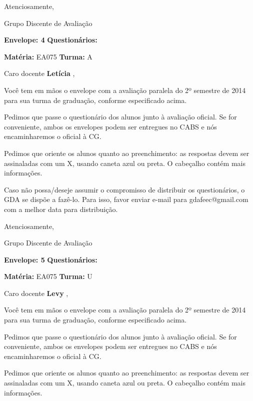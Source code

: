 \documentclass[a5paper]{letter}
\begin{document}
Atenciosamente, 

Grupo Discente de Avaliação

\vspace{0.5cm}

{\bf Envelope: 4 }		\hfill	{\bf Questionários:} \hspace{2cm}

\newpage
\thispagestyle{empty}

\hfill {\bf Matéria:} EA075 {\bf Turma:} A

Caro docente {\bf Letícia }, 

	Você tem em mãos o envelope com a avaliação paralela do 2º semestre de 2014 para sua turma de graduação, conforme especificado acima.

	Pedimos que passe o questionário dos alunos junto à avaliação oficial. Se for conveniente, ambos os envelopes podem ser entregues no CABS e nós encaminharemos o oficial à CG.

Pedimos que oriente os alunos quanto ao preenchimento: as respostas devem ser assinaladas com um X, usando caneta azul ou preta. O cabeçalho contém mais informações.

	Caso não possa/deseje assumir o compromisso de distribuir os questionários, o GDA se dispõe a fazê-lo. Para isso, favor enviar e-mail para gdafeec@gmail.com com a melhor data para distribuição.


Atenciosamente, 

Grupo Discente de Avaliação

\vspace{0.5cm}

{\bf Envelope: 5 }		\hfill	{\bf Questionários:} \hspace{2cm}

\newpage
\thispagestyle{empty}

\hfill {\bf Matéria:} EA075 {\bf Turma:} U

Caro docente {\bf Levy }, 

	Você tem em mãos o envelope com a avaliação paralela do 2º semestre de 2014 para sua turma de graduação, conforme especificado acima.

	Pedimos que passe o questionário dos alunos junto à avaliação oficial. Se for conveniente, ambos os envelopes podem ser entregues no CABS e nós encaminharemos o oficial à CG.

Pedimos que oriente os alunos quanto ao preenchimento: as respostas devem ser assinaladas com um X, usando caneta azul ou preta. O cabeçalho contém mais informações.
\end{document}
